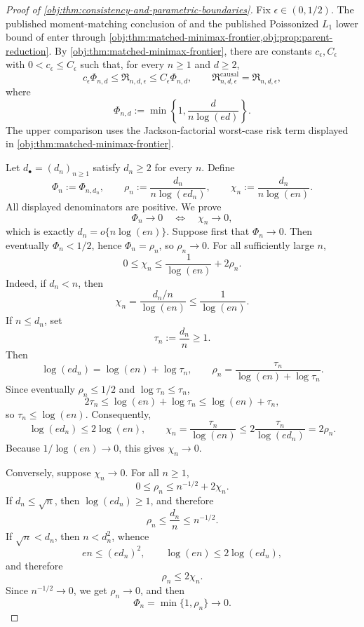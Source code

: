 \documentclass[11pt]{article}
\begin{document}
\begin{proof}[Proof of \cref{obj:thm:consistency-and-parametric-boundaries}]
Fix \(\epsilon\in(0,1/2)\).  The published moment-matching conclusion of \citep[Lemma 1 and Section 3.1]{CaiLow2011L1} and the published Poissonized \(L_1\) lower bound of \citep[Theorem 3, equation (24)]{JiaoHanWeissman2018L1} enter through \cref{obj:thm:matched-minimax-frontier,obj:prop:parent-reduction}.  By \cref{obj:thm:matched-minimax-frontier}, there are constants \(c_\epsilon,C_\epsilon\) with \(0<c_\epsilon\le C_\epsilon\) such that, for every \(n\ge1\) and \(d\ge2\),
\[
c_\epsilon \Phi_{n,d}
\le
\mathfrak R_{n,d,\epsilon}
\le
C_\epsilon \Phi_{n,d},
\qquad
\mathfrak R^{\mathrm{causal}}_{n,d,\epsilon}
=
\mathfrak R_{n,d,\epsilon},
\]
where
\[
\Phi_{n,d}
:=
\min\left\{1,\frac{d}{n\log(ed)}\right\}.
\]
The upper comparison uses the Jackson-factorial worst-case risk term displayed in \cref{obj:thm:matched-minimax-frontier}. %

Let \(d_\bullet=(d_n)_{n\ge1}\) satisfy \(d_n\ge2\) for every \(n\).  Define
\[
\Phi_n:=\Phi_{n,d_n},
\qquad
\rho_n:=\frac{d_n}{n\log(ed_n)},
\qquad
\chi_n:=\frac{d_n}{n\log(en)}.
\]
All displayed denominators are positive.  We prove
\[
\Phi_n\to0
\quad\Longleftrightarrow\quad
\chi_n\to0,
\]
which is exactly \(d_n=o\{n\log(en)\}\).  Suppose first that \(\Phi_n\to0\).  Then eventually \(\Phi_n<1/2\), hence \(\Phi_n=\rho_n\), so \(\rho_n\to0\).  For all sufficiently large \(n\),
\[
0\le \chi_n\le \frac1{\log(en)}+2\rho_n .
\]
Indeed, if \(d_n<n\), then
\[
\chi_n=\frac{d_n/n}{\log(en)}
\le \frac1{\log(en)}.
\]
If \(n\le d_n\), set
\[
\tau_n:=\frac{d_n}{n}\ge1.
\]
Then
\[
\log(ed_n)=\log(en)+\log\tau_n,
\qquad
\rho_n=\frac{\tau_n}{\log(en)+\log\tau_n}.
\]
Since eventually \(\rho_n\le1/2\) and \(\log\tau_n\le\tau_n\),
\[
2\tau_n\le \log(en)+\log\tau_n\le \log(en)+\tau_n,
\]
so \(\tau_n\le\log(en)\).  Consequently,
\[
\log(ed_n)\le 2\log(en),
\qquad
\chi_n=\frac{\tau_n}{\log(en)}
\le
2\frac{\tau_n}{\log(ed_n)}
=
2\rho_n .
\]
Because \(1/\log(en)\to0\), this gives \(\chi_n\to0\).

Conversely, suppose \(\chi_n\to0\).  For all \(n\ge1\),
\[
0\le \rho_n\le n^{-1/2}+2\chi_n .
\]
If \(d_n\le\sqrt n\), then \(\log(ed_n)\ge1\), and therefore
\[
\rho_n\le\frac{d_n}{n}\le n^{-1/2}.
\]
If \(\sqrt n<d_n\), then \(n<d_n^2\), whence
\[
en\le (ed_n)^2,
\qquad
\log(en)\le2\log(ed_n),
\]
and therefore
\[
\rho_n\le2\chi_n .
\]
Since \(n^{-1/2}\to0\), we get \(\rho_n\to0\), and then
\[
\Phi_n=\min\{1,\rho_n\}\to0 .
\] %


\end{proof}
\end{document}
